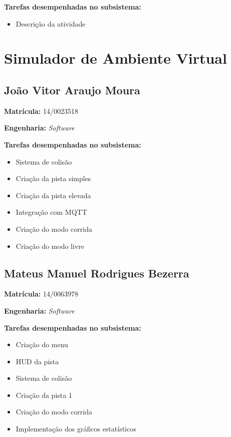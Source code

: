 \textbf{Tarefas desempenhadas no subsistema:}

\begin{itemize}
\item Descrição da atividade
\end{itemize}

\section{Simulador de Ambiente Virtual}

\subsection{João Vitor Araujo Moura}

\textbf{Matrícula:} 14/0023518

\textbf{Engenharia:} \textit{Software}

\textbf{Tarefas desempenhadas no subsistema:}

\begin{itemize}
\item Sistema de colisão
\item Criação da pista simples
\item Criação da pista elevada
\item Integração com MQTT
\item Criação do modo corrida
\item Criação do modo livre
\end{itemize}


\subsection{Mateus Manuel Rodrigues Bezerra}

\textbf{Matrícula:} 14/0063978

\textbf{Engenharia:} \textit{Software}

\textbf{Tarefas desempenhadas no subsistema:}

\begin{itemize}
\item Criação do menu
\item HUD da pista
\item Sistema de colisão
\item Criação da pista 1
\item Criação do modo corrida
\item Implementação dos gráficos estatísticos
\end{itemize}



